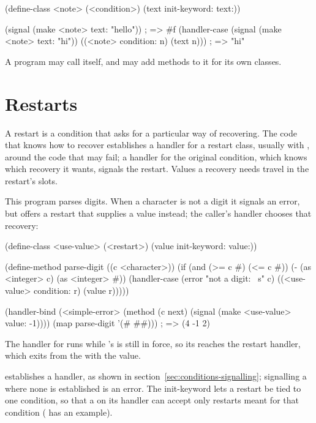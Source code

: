 \begin{dylan}
(define-class <note> (<condition>)
  (text init-keyword: text:))

(signal (make <note> text: "hello"))          ; => #f
(handler-case (signal (make <note> text: "hi"))
  ((<note> condition: n) (text n)))           ; => "hi"
\end{dylan}

\noindent A program may call  itself, and may add
methods to it for its own classes.

\section{Restarts}\label{sec:conditions-restarts}

A restart is a condition that asks for a particular way of recovering.
The code that knows how to recover establishes a handler for a restart
class, usually with , around the code that may fail;
a handler for the original condition, which knows which recovery it
wants, signals the restart. Values a recovery needs travel in the
restart's slots.

This program parses digits. When a character is not a digit it signals
an error, but offers a  restart that supplies a value
instead; the caller's handler chooses that recovery:

\begin{dylan}
(define-class <use-value> (<restart>)
  (value init-keyword: value:))

(define-method parse-digit ((c <character>))
  (if (and (>= c #\0) (<= c #\9))
      (- (as <integer> c) (as <integer> #\0))
      (handler-case (error "not a digit: ~s" c)
        ((<use-value> condition: r) (value r)))))

(handler-bind (<simple-error>
               (method (c next) (signal (make <use-value> value: -1))))
  (map parse-digit '(#\4 #\x #\2)))
; => (4 -1 2)
\end{dylan}

\noindent The handler for  runs while
's  is still in force, so its
 reaches the restart handler, which exits from the
 with the value.

 establishes a  handler, as shown in
section~\ref{sec:conditions-signalling}; signalling a
 where none is established is an error. The
 init-keyword lets a restart be tied to one condition,
so that a  on its handler can accept only restarts meant
for that condition ( has an example).

